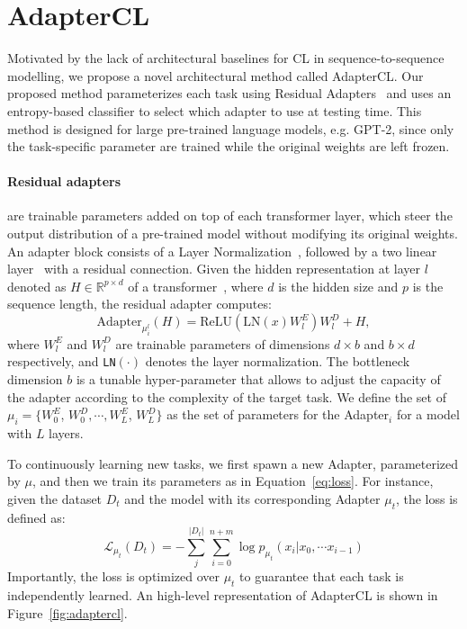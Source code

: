 \documentclass[11pt,a4paper]{article}
\begin{document}
\section{AdapterCL} \label{sec:adpt}
Motivated by the lack of architectural baselines for CL in sequence-to-sequence modelling, we propose a novel architectural method called AdapterCL. Our proposed method parameterizes each task using Residual Adapters~\cite{houlsby2019parameter} and uses an entropy-based classifier to select which adapter to use at testing time. This method is designed for large pre-trained language models, e.g. GPT-2, since only the task-specific parameter are trained while the original weights are left frozen. 

\paragraph{Residual adapters} are trainable parameters added on top of each transformer layer, which steer the output distribution of a pre-trained model without modifying its original weights. 
%
An adapter block consists of a Layer Normalization~\cite{ba2016layer}, followed by a two linear layer~\cite{hinton1994autoencoders} with a residual connection. Given the hidden representation at layer $l$ denoted as $H \in \mathbb{R}^{p\times d}$ of a transformer~\cite{vaswani2017attention}, where $d$ is the hidden size and $p$ is the sequence length, the residual adapter computes:
\begin{equation}
\mathrm{Adapter}_{\mu_i^l}(H) =  \mathrm{ReLU}(\mathrm{LN}(x) W_l^{E})W_l^{D} + H,
\end{equation}
where $W_l^{E}$ and $W_l^{D}$ are trainable parameters of dimensions $d\times b$ and $b\times d$ respectively, and \texttt{LN}$(\cdot)$ denotes the layer normalization. The bottleneck dimension $b$ is a tunable hyper-parameter that allows to adjust the capacity of the adapter according to the complexity of the target task. We define the set of $\mu_i = \{ W_0^{E}$, $W_0^{D}, \cdots,  W_L^{E}$, $W_L^{D} \}$ as the set of parameters for the Adapter$_i$ for a model with $L$ layers.

To continuously learning new tasks, we first spawn a new Adapter, parameterized by $\mu$, and then we train its parameters as in Equation~\ref{eq:loss}. For instance, given the dataset $D_t$ and the model with its corresponding Adapter $\mu_t$, the loss is defined as:
\begin{equation}
  \mathcal{L}_{\mu_t}(D_t) =  - \sum_j^{|D_t|} \sum_{i=0}^{n+m} \log p_{\mu_t}(x_i|x_{0}, \cdots x_{i-1}) \label{eq:lossadpt}
\end{equation}
Importantly, the loss is optimized over $\mu_t$ to guarantee that each task is independently learned. An high-level representation of AdapterCL is shown in Figure~\ref{fig:adaptercl}.
\end{document}
